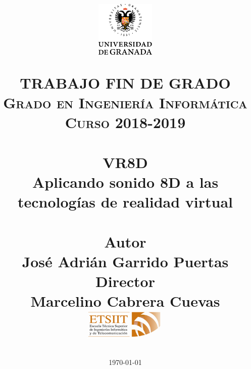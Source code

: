 
\usepackage{url}
\usepackage[document]{ragged2e}
\usepackage{outlines}
\usepackage{listings}
\renewcommand{\lstlistingname}{Código}%
\renewcommand{\lstlistlistingname}{Indice de \lstlistingname s}%
\usepackage{xcolor}

\title{	
	\normalfont \normalsize
	\begin{figure}[htb]
		\centering
		\includegraphics[width=0.25\textwidth]{./imagenes/1}
	\end{figure}
	\textsc{\textbf{TRABAJO FIN DE GRADO} \\ Grado en Ingeniería Informática \\ 
	Curso 2018-2019} \\ [25pt] 
	\horrule{0.5pt} \\[0.4cm]
	\huge VR8D \\
	\huge Aplicando sonido 8D a las tecnologías de realidad virtual
	\\ 
	\horrule{2pt} \\[0.5cm]
	\textbf{Autor}\\ {José Adrián Garrido Puertas}\\[1.0ex]
	\textbf{Director}\\ {Marcelino Cabrera Cuevas}\\[0.5cm]
	\includegraphics[width=0.3\textwidth]{imagenes/etsiit_logo.png}\\[0.1cm]
	\date{\normalsize\today} 
}





	
	\maketitle %
	

